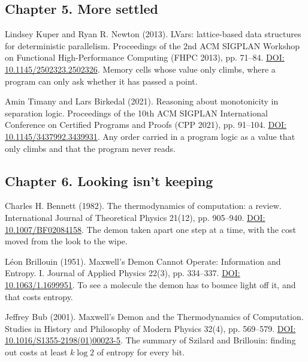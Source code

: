 \subsection*{Chapter 5. More settled}

\noindent Lindsey Kuper and Ryan R. Newton (2013). LVars: lattice-based data structures for deterministic parallelism. Proceedings of the 2nd ACM SIGPLAN Workshop on Functional High-Performance Computing (FHPC 2013), pp. 71--84. \href{https://doi.org/10.1145/2502323.2502326}{DOI: 10.1145/2502323.2502326}. Memory cells whose value only climbs, where a program can only ask whether it has passed a point.
\par\medskip

\noindent Amin Timany and Lars Birkedal (2021). Reasoning about monotonicity in separation logic. Proceedings of the 10th ACM SIGPLAN International Conference on Certified Programs and Proofs (CPP 2021), pp. 91--104. \href{https://doi.org/10.1145/3437992.3439931}{DOI: 10.1145/3437992.3439931}. Any order carried in a program logic as a value that only climbs and that the program never reads.
\par\medskip

\subsection*{Chapter 6. Looking isn't keeping}

\noindent Charles H. Bennett (1982). The thermodynamics of computation: a review. International Journal of Theoretical Physics 21(12), pp. 905--940. \href{https://doi.org/10.1007/BF02084158}{DOI: 10.1007/BF02084158}. The demon taken apart one step at a time, with the cost moved from the look to the wipe.
\par\medskip

\noindent L\'eon Brillouin (1951). Maxwell's Demon Cannot Operate: Information and Entropy. I. Journal of Applied Physics 22(3), pp. 334--337. \href{https://doi.org/10.1063/1.1699951}{DOI: 10.1063/1.1699951}. To see a molecule the demon has to bounce light off it, and that costs entropy.
\par\medskip

\noindent Jeffrey Bub (2001). Maxwell's Demon and the Thermodynamics of Computation. Studies in History and Philosophy of Modern Physics 32(4), pp. 569--579. \href{https://doi.org/10.1016/S1355-2198(01)00023-5}{DOI: 10.1016/S1355-2198(01)00023-5}. The summary of Szilard and Brillouin: finding out costs at least $k \log 2$ of entropy for every bit.
\par\medskip


